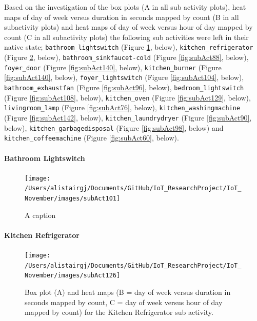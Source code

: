 \documentclass[11pt,]{article}
\let\oldparagraph\paragraph
\renewcommand{\paragraph}[1]{\oldparagraph{#1}\mbox{}}
\begin{document}
Based on the investigation of the box plots (A in all sub activity
plots), heat maps of day of week versus duration in seconds mapped by
count (B in all subactivity plots) and heat maps of day of week versus
hour of day mapped by count (C in all subactivity plots) the following
sub activities were left in their native state;
\texttt{bathroom\_lightswitch} (Figure \ref{fig:subAct101}, below),
\texttt{kitchen\_refrigerator} (Figure \ref{fig:subAct126}, below),
\texttt{bathroom\_sinkfaucet-cold} (Figure \ref{fig:subAct88}, below),
\texttt{foyer\_door} (Figure \ref{fig:subAct140}, below),
\texttt{kitchen\_burner} (Figure \ref{fig:subAct140}, below),
\texttt{foyer\_lightswitch} (Figure \ref{fig:subAct104}, below),
\texttt{bathroom\_exhaustfan} (Figure \ref{fig:subAct96}, below),
\texttt{bedroom\_lightswitch} (Figure \ref{fig:subAct108}, below),
\texttt{kitchen\_oven} (Figure \ref{fig:subAct129}, below),
\texttt{livingroom\_lamp} (Figure \ref{fig:subAct76}, below),
\texttt{kitchen\_washingmachine} (Figure \ref{fig:subAct142}, below),
\texttt{kitchen\_laundrydryer} (Figure \ref{fig:subAct90}, below),
\texttt{kitchen\_garbagedisposal} (Figure \ref{fig:subAct98}, below) and
\texttt{kitchen\_coffeemachine} (Figure \ref{fig:subAct60}, below).

\hypertarget{bathroom-lightswitch}{%
\paragraph{Bathroom Lightswitch}\label{bathroom-lightswitch}}

\begin{figure}[H]

{\centering \texttt{[image: /Users/alistairgj/Documents/GitHub/IoT\_ResearchProject/IoT\_November/images/subAct101]} 

}

\caption{A caption}\label{fig:subAct101}
\end{figure}

\hypertarget{kitchen-refrigerator}{%
\paragraph{Kitchen Refrigerator}\label{kitchen-refrigerator}}

\begin{figure}[H]

{\centering \texttt{[image: /Users/alistairgj/Documents/GitHub/IoT\_ResearchProject/IoT\_November/images/subAct126]} 

}

\caption{Box plot (A) and heat maps (B = day of week versus duration in seconds mapped by count, C = day of week versus hour of day mapped by count) for the Kitchen Refrigerator sub activity.}\label{fig:subAct126}
\end{figure}
\end{document}
